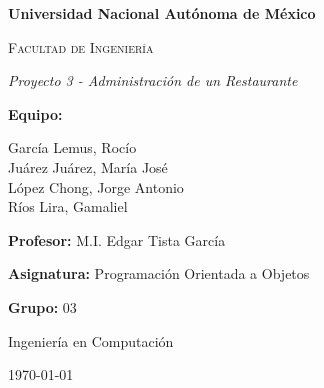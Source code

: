 \begin{titlepage}
  \centering
  {\bfseries\huge Universidad Nacional Autónoma de México \par}
  \vspace{1cm}
  {\scshape\LARGE Facultad de Ingeniería \par}
  \vfill
  {\itshape\Huge Proyecto 3 - Administración de un Restaurante\par}
  \vfill
  {\LARGE \textbf{Equipo: }\par}
  \vspace{0.5cm}
  {\large García Lemus, Rocío\\Juárez Juárez, María José\\López Chong, Jorge Antonio\\Ríos Lira, Gamaliel\par}
  \vfill
  {\Large \textbf{Profesor:} M.I. Edgar Tista García \par}
  {\Large \textbf{Asignatura:} Programación Orientada a Objetos \par}
  {\Large \textbf{Grupo:} 03 \par}
  \vfill
  {\large Ingeniería en Computación \par}
  {\large \today \par}
\end{titlepage}
